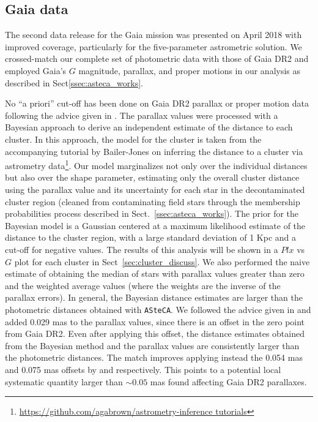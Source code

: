 \documentclass[draft]{aa}
\begin{document}
\subsection{Gaia data}
\label{ssec:gaia_data}

The second data release for the Gaia mission \citep{GaiaDR2_2018} was presented
on April 2018 with improved coverage, particularly for the five-parameter
astrometric solution.
We crossed-match our complete set of photometric data with those of Gaia DR2
and employed Gaia's $G$ magnitude, parallax, and proper motions in our
analysis as described in Sect\ref{ssec:asteca_works}.

No ``a priori'' cut-off has been done on Gaia DR2 parallax or proper motion
data following the advice given in \cite{Luri_2018}. The parallax values were
processed with a Bayesian approach to derive an independent estimate of the
distance to each cluster. In this approach, the model for the cluster is
taken from the accompanying tutorial by Bailer-Jones on inferring the distance
to a cluster via astrometry
data\footnote{\url{https://github.com/agabrown/astrometry-inference tutorials}}.
Our model marginalizes not only over the individual distances but also over the
shape parameter, estimating only the overall cluster distance using the
parallax value and its uncertainty for each star in the decontaminated cluster
region (cleaned from contaminating field stars through the membership
probabilities process described in Sect.~\ref{ssec:asteca_works}).
The prior for the Bayesian model is a Gaussian centered at a maximum likelihood
estimate of the distance to the cluster region, with a large standard deviation
of 1 Kpc and a cut-off for negative values. The results of this analysis will
be shown in a $Plx$ vs $G$ plot for each cluster in
Sect~\ref{sec:cluster_discuss}. We also performed the naive estimate of
obtaining the median of stars with parallax values greater than zero
and the weighted average values (where the weights are the inverse of the
parallax errors).
%
In general, the Bayesian distance estimates are larger than the photometric
distances obtained with \texttt{ASteCA}. We followed the advice given in 
\cite{Lindegren_2018} and added 0.029 mas to the parallax values, since there
is an offset in the zero point from Gaia DR2. Even after applying this offset,
the distance estimates obtained from the Bayesian method and the parallax
values are consistently larger than the photometric distances. The match
improves applying instead the 0.054 mas and 0.075 mas offsets by
\cite{Schonrich2019} and \cite{Xu_2019} respectively. This points to a potential
local systematic quantity larger than $\sim0.05$ mas found affecting Gaia DR2
parallaxes.\\
\end{document}

